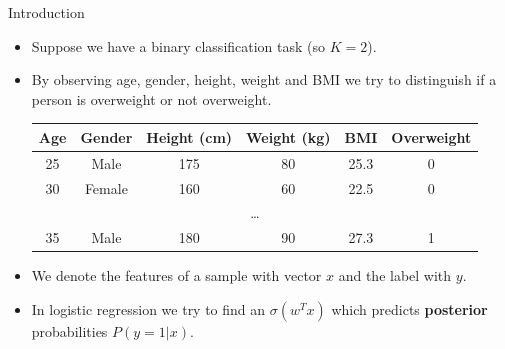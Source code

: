 \documentclass[serif, aspectratio=169]{beamer}
\begin{document}
    \begin{frame}{Introduction}
        \begin{itemize}
            \item Suppose we have a binary classification task (so $K=2$).
            \item By observing \textcolor{deepred}{age}, \textcolor{deepred}{gender}, \textcolor{deepred}{height}, \textcolor{deepred}{weight} and \textcolor{deepred}{BMI} we try to distinguish if a person is \textcolor{deepgreen}{overweight} or \textcolor{deepgreen}{not overweight}.


            \begin{table}[h!]
                \centering
                \begin{tabular}{|c|c|c|c|c|c|}
                    \hline
                    \textcolor{deepred}{Age} & \textcolor{deepred}{Gender} & \textcolor{deepred}{Height (cm)} & \textcolor{deepred}{Weight (kg)} & \textcolor{deepred}{BMI} & \textcolor{deepgreen}{Overweight} \\ \hline
                    25 & Male & 175 & 80 & 25.3 & 0 \\ \hline
                    30 & Female & 160 & 60 & 22.5 & 0 \\ \hline
                    \multicolumn{6}{|c|}{\dots} \\ \hline
                    35 & Male & 180 & 90 & 27.3 & 1 \\ \hline
                \end{tabular}
            \end{table}
            \item We denote the \textcolor{deepred}{features} of a sample with vector $x$ and the \textcolor{deepgreen}{label} with $y$.
            \item In logistic regression we try to find an $\sigma (w^Tx)$ which predicts \textbf{posterior} probabilities $P(y=1|x)$.
        \end{itemize}

    \end{frame}
\end{document}
